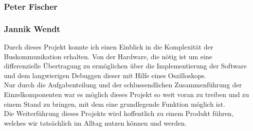 \subsubsection{Peter Fischer}

\subsubsection{Jannik Wendt}
Durch dieses Projekt konnte ich einen Einblick in die Komplexität der Buskommunikation erhalten. Von der Hardware, die nötig ist um eine differenzielle Übertragung zu ermöglichen über die Implementierung der Software und dem langwierigen Debuggen dieser mit Hilfe eines Oszilloskops. \\
Nur durch die Aufgabenteilung und der schlussendlichen Zusammenführung der Einzelkomponenten war es möglich dieses Projekt so weit voran zu treiben und zu einem Stand zu bringen, mit dem eine grundlegende Funktion möglich ist.\\ 
Die Weiterführung dieses Projekts wird hoffentlich zu einem Produkt führen, welches wir tatsächlich im Alltag nutzen können und werden.